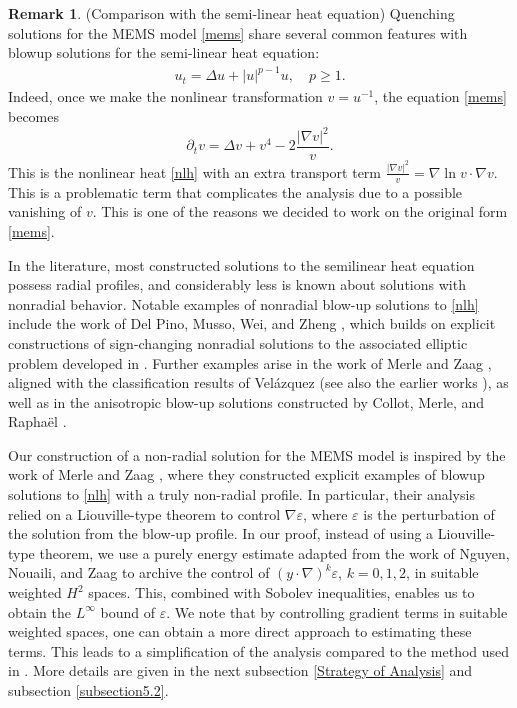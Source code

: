 \documentclass[11pt,reqno]{amsart}
\theoremstyle{definition}
\theoremstyle{bfremark}
\newtheorem{remark}{Remark}[section]
\numberwithin{equation}{section}
\begin{document}
\begin{remark}(Comparison with the semi-linear heat equation)
Quenching solutions for the MEMS model \eqref{mems} share several common features with blowup solutions for the semi-linear heat equation:
\begin{align}
    u_t=\Delta u+|u|^{p-1}u, \quad p \geq 1.\label{nlh}
\end{align}
Indeed, once we make the nonlinear transformation $v = u^{-1}$, the equation \eqref{mems} becomes 
\begin{equation} \label{eq:v}
    \partial_t v = \Delta v + v^4  - 2\frac{|\nabla v|^2}{v}.
\end{equation}
This is the nonlinear heat \eqref{nlh} with an extra transport term $\frac{|\nabla v|^2}{v} = \nabla \ln v  \cdot \nabla v$. This is a problematic term that complicates the analysis due to a possible vanishing of $v$. This is one of the reasons we decided to work on the original form \eqref{mems}.

In the literature, most constructed solutions to the semilinear heat equation possess radial profiles, and considerably less is known about solutions with nonradial behavior. Notable examples of nonradial blow-up solutions to \eqref{nlh} include the work of Del Pino, Musso, Wei, and Zheng \cite{del2018sign}, which builds on explicit constructions of sign-changing nonradial solutions to the associated elliptic problem developed in \cite{del2011large, del2013torus}. Further examples arise in the work of Merle and Zaag \cite{merle2024degenerate}, aligned with the classification results of Velázquez \cite{velazquez1993classification} (see also the earlier works \cite{herrero1993blow, filippas1992refined, filippas1993blowup}), as well as in the anisotropic blow-up solutions constructed by Collot, Merle, and Rapha\"el \cite{collot2017strongly}.

Our construction of a non-radial solution for the MEMS model is inspired by the work of Merle and Zaag \cite{merle2024degenerate}, where they constructed explicit examples of blowup solutions to \eqref{nlh} with a truly non-radial profile. In particular, their analysis relied on a Liouville-type theorem to control \(\nabla \varepsilon\), where \(\varepsilon\) is the perturbation of the solution from the blow-up profile. In our proof, instead of using a Liouville-type theorem, we use a purely energy estimate adapted from the work of Nguyen, Nouaili, and Zaag \cite{nguyen2025construction} to archive the control of \((y \cdot \nabla)^k \varepsilon\), \(k = 0, 1, 2\), in suitable weighted \(H^2\) spaces. This, combined with Sobolev inequalities, enables us to obtain the \(L^\infty\) bound of \(\varepsilon\). We note that by controlling gradient terms in suitable weighted spaces, one can obtain a more direct approach to estimating these terms. This leads to a simplification of the analysis compared to the method used in \cite{merle2024degenerate}. More details are given in the next subsection \ref{Strategy of Analysis} and subsection \ref{subsection5.2}.
\end{remark}
\end{document}
